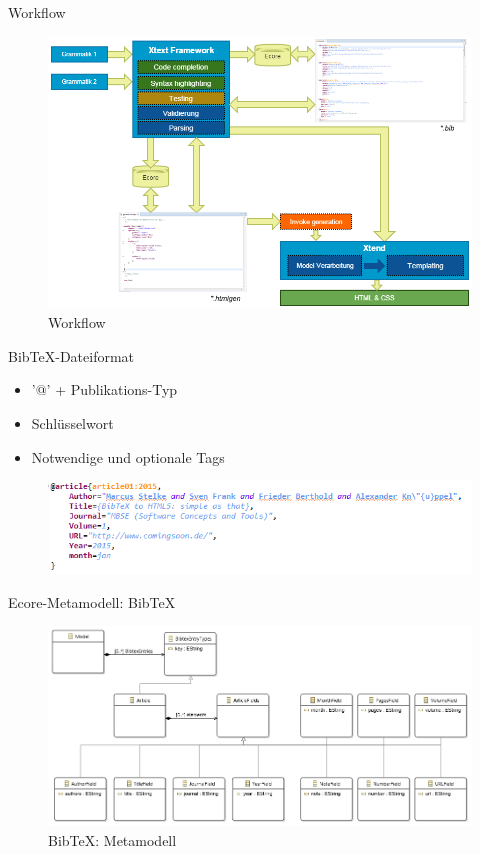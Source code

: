 \documentclass[fleqn,11pt,aspectratio=43]{beamer}
\begin{document}
\begin{frame}{Workflow}
\begin{figure}
\includegraphics[scale=0.3]{../xtext_workflow.png} 
\caption{Workflow}
\end{figure}
\end{frame}

\begin{frame}{BibTeX-Dateiformat}
\begin{itemize}
\item '@' + Publikations-Typ
\item Schlüsselwort
\item Notwendige und optionale Tags
\end{itemize}
\begin{figure}
\includegraphics[scale=0.6]{../bibtex_format1.png} 
\end{figure}
\end{frame}

\begin{frame}{Ecore-Metamodell: BibTeX}
\begin{figure}
\includegraphics[scale=0.28]{../bibtex_ecore.png} 
\caption{BibTeX: Metamodell}
\end{figure}  
\end{frame}
\end{document}
